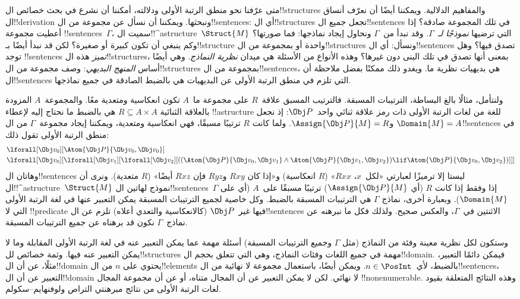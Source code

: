 \documentclass[../../../include/open-logic-section]{subfiles}
\begin{document}


متى عرّفنا نحو منطق الرتبة الأولى ودلالته، أمكننا أن نشرع في بحث خصائص
ال!!{structure}s والمفاهيم الدلالية. ويمكننا أيضًا أن نعرّف أنساق
ال!!{derivation} ونبحثها. ويمكننا أن نسأل عن مجموعة من
ال!!{sentence}s: أي ال!!{structure}s تجعل جميع ال!!{sentence}s في
تلك المجموعة صادقة؟ إذا أعطيت مجموعة !!{sentence}s~$\Gamma$، سميت
ال!!^a{structure}~$\Struct{M}$ التي ترضيها \emph{نموذجًا
لـ~$\Gamma$}. وقد نبدأ من~$\Gamma$ ونحاول إيجاد نماذجها: فما صورتها؟
وكم ينبغي أن تكون كبيرة أو صغيرة؟ لكن قد نبدأ أيضًا بـ!!{structure}
واحدة أو بمجموعة من ال!!{structure}s ونسأل: أي ال!!{sentence}s تصدق
فيها؟ وهل توجد !!{sentence}s \emph{تميز} هذه ال!!{structure}s، بمعنى
أنها تصدق في تلك البنى دون غيرها؟ وهذه الأنواع من الأسئلة هي ميدان
\emph{نظرية النماذج}. وهي أيضًا أساس \emph{المنهج البديهي}: وصف
مجموعة من ال!!{structure}s بمجموعة من ال!!{sentence}s، هي بديهيات
نظرية ما. ويغدو ذلك ممكنًا بفضل ملاحظة أن ال!!{sentence}s التي تلزم في منطق
الرتبة الأولى عن البديهيات هي بالضبط الصادقة في جميع نماذجها.

ولنتأمل، مثالًا بالغ البساطة، الترتيبات المسبقة. فالترتيب المسبق
علاقة~$R$ على مجموعة ما~$A$ تكون انعكاسية ومتعدية معًا. والمجموعة~$A$
المزودة بالعلاقة الثنائية $R \subseteq A \times A$ هي بالضبط ما
نحتاج إليه لإعطاء !!a{structure} للغة من لغات الرتبة الأولى ذات رمز
علاقة ثنائي واحد~$\Obj P$: إذ نجعل
$\Domain{M} = A$ و$\Assign{\Obj P}{M} = R$. ولما كانت $R$ ترتيبًا
مسبقًا، فهي انعكاسية ومتعدية، ويمكننا إيجاد مجموعة~$\Gamma$ من
ال!!{sentence}s في منطق الرتبة الأولى تقول ذلك:
\begin{align*}
  & \lforall[\Obj v_0][\Atom{\Obj P}{\Obj v_0,\Obj v_0}]\\
  & \lforall[\Obj v_0][\lforall[\Obj v_1][\lforall[\Obj v_2][((\Atom{\Obj P}{\Obj v_0,\Obj v_1} \land \Atom{\Obj P}{\Obj v_1,\Obj v_2}) \lif \Atom{\Obj P}{\Obj v_0,\Obj v_2})]]]
\end{align*}
وهاتان ال!!{sentence}s ليستا إلا ترميزًا لعبارتي «لكل~$x$،
$Rxx$» ($R$ انعكاسية) و«إذا كان $Rxy$ و$Ryz$ فإن $Rxz$ أيضًا»
($R$ متعدية). ونرى أن ال!!^a{structure}~$\Struct{M}$ نموذج لهاتين
ال!!{sentence}s~$\Gamma$ إذا وفقط إذا كانت $R$ (أي
$\Assign{\Obj P}{M}$) ترتيبًا مسبقًا على~$A$ (أي على
$\Domain{M}$). وبعبارة أخرى، نماذج $\Gamma$ هي الترتيبات المسبقة
بالضبط. وكل خاصية لجميع الترتيبات المسبقة يمكن التعبير عنها في لغة
الرتبة الأولى التي لا !!{predicate} فيها غير~$\Obj P$ (كالانعكاسية
والتعدي أعلاه) تلزم عن ال!!{sentence}s الاثنتين في~$\Gamma$، والعكس
صحيح. ولذلك فكل ما نبرهنه عن نماذج~$\Gamma$ نكون قد برهناه عن جميع
الترتيبات المسبقة.

وستكون لكل نظرية معينة وفئة من النماذج (مثل $\Gamma$ وجميع الترتيبات
المسبقة) أسئلة مهمة عما يمكن التعبير عنه في لغة الرتبة الأولى المقابلة
وما لا يمكن التعبير عنه فيها. وثمة خصائص لل!!{structure}s مهمة في
جميع اللغات وفئات النماذج، وهي التي تتعلق بحجم ال!!{domain}. فيمكن
دائمًا التعبير، مثلًا، عن أن ال!!{domain} يحتوي على $n$ من
ال!!{element}s بالضبط، لأي~$n \in \PosInt$. ويمكن أيضًا، باستعمال
مجموعة لا نهائية من ال!!{sentence}s، التعبير عن أن ال!!{domain} لا
نهائي. لكن لا يمكن التعبير عن أن المجال متناه، أو عن أن مجموعة
المجال !!{nonenumerable}. وهذه النتائج المتعلقة بقيود لغات الرتبة الأولى من
نتائج مبرهنتي التراص ولوفنهايم--سكولم.
\end{document}
